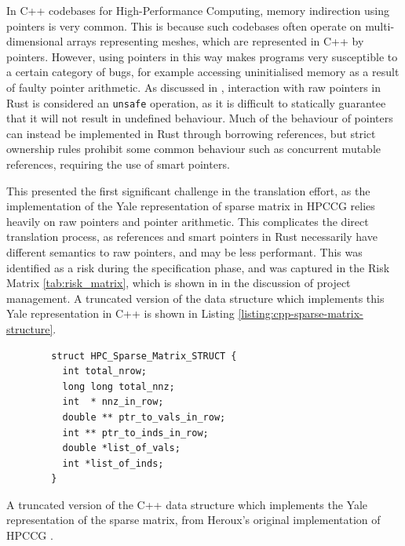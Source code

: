 In C++ codebases for High-Performance Computing, memory indirection using pointers is very common. This is because such codebases often operate on multi-dimensional arrays representing meshes, which are represented in C++ by pointers. However, using pointers in this way makes programs very susceptible to a certain category of bugs, for example accessing uninitialised memory as a result of faulty pointer arithmetic. As discussed in , interaction with raw pointers in Rust is considered an \texttt{unsafe} operation, as it is difficult to statically guarantee that it will not result in undefined behaviour. Much of the behaviour of pointers can instead be implemented in Rust through borrowing references, but strict ownership rules prohibit some common behaviour such as concurrent mutable references, requiring the use of smart pointers.

This presented the first significant challenge in the translation effort, as the implementation of the Yale representation of sparse matrix in HPCCG relies heavily on raw pointers and pointer arithmetic. This complicates the direct translation process, as references and smart pointers in Rust necessarily have different semantics to raw pointers, and may be less performant. This was identified as a risk during the specification phase, and was captured in the Risk Matrix \ref{tab:risk_matrix}, which is shown in  in the discussion of project management. A truncated version of the data structure which implements this Yale representation in C++ is shown in Listing \ref{listing:cpp-sparse-matrix-structure}.

\begin{code}
    \begin{verbatim}
        struct HPC_Sparse_Matrix_STRUCT {
          int total_nrow;
          long long total_nnz;
          int  * nnz_in_row;
          double ** ptr_to_vals_in_row;
          int ** ptr_to_inds_in_row;
          double *list_of_vals;
          int *list_of_inds;
        }
    \end{verbatim}
    \caption{A truncated version of the C++ data structure which implements the Yale representation of the sparse matrix, from Heroux's original implementation of HPCCG \cite{MantevoHPCCG2023}.}
    \label{listing:cpp-sparse-matrix-structure}
\end{code}

